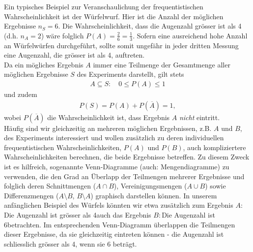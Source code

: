 Ein typisches Beispiel zur Veranschaulichung der frequentistischen Wahrscheinlichkeit ist der Würfelwurf. Hier ist die Anzahl der möglichen Ergebnisse $n_S=6$. Die Wahrscheinlichkeit, dass die Augenzahl grösser ist als 4 (d.h. $n_A = 2$) wäre folglich $P(A)=\frac{2}{6}=\frac{1}{3}$. Sofern eine ausreichend hohe Anzahl an Würfelwürfen durchgeführt, sollte somit ungefähr in jeder dritten Messung eine Augenzahl, die grösser ist als 4, auftreten. \\

Da ein mögliches Ergebnis $A$ immer eine Teilmenge der Gesamtmenge aller möglichen Ergebnisse $S$ des Experiments darstellt, gilt  stets
\begin{align}
A \subseteq S:  \quad 0 \leq P ( A ) \leq 1
\end{align}
und zudem
\begin{align}
P(S) =  P(A) + P(\overline{A}) =  1,
\end{align}
wobei $P(\overline{A})$ die Wahrscheinlichkeit ist, dass Ergebnis $A$ \textit{nicht} eintritt. \\

Häufig sind wir gleichzeitig an mehreren möglichen Ergebnissen, z.B. $A$ und $B$, des Experiments interessiert und wollen zusätzlich zu deren individuellen frequentistischen Wahrscheinlichkeiten, $P(A)$ und $P(B)$, auch kompliziertere Wahrscheinlichkeiten berechnen, die beide Ergebnisse betreffen. Zu diesem Zweck ist es hilfreich, sogenannte Venn-Diagramme (auch: Mengendiagramme) zu verwenden, die den Grad an Überlapp der Teilmengen mehrerer Ergebnisse und folglich deren Schnittmengen ($A\cap B$), Vereinigungsmengen ($A \cup B$) sowie Differenzmengen ($A\setminus B $, $B \setminus A$)  graphisch darstellen können. In unserem anfänglichen Beispiel des Würfels könnten wir etwa zusätzlich zum Ergebnis $A:$\glqq Die Augenzahl ist grösser als 4\grqq auch das Ergebnis $B:$\glqq Die Augenzahl ist 6\grqq betrachten. Im entsprechenden Venn-Diagramm überlappen die Teilmengen dieser Ergebnisse, da sie gleichzeitig eintreten können - die Augenzahl ist schliesslich grösser als 4, wenn sie 6 beträgt. 

